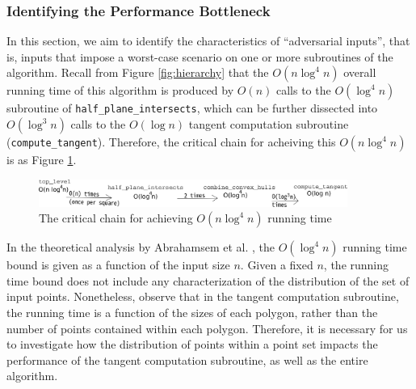 \documentclass{article}
\newcommand{\figref}[1]{Figure \ref{#1}}
\begin{document}
\subsubsection{Identifying the Performance Bottleneck}

In this section, we aim to identify the characteristics of ``adversarial inputs'', that is, inputs that impose a worst-case scenario on one or more subroutines of the algorithm. Recall from \figref{fig:hierarchy} that the $O(n\log^4n)$ overall running time of this algorithm is produced by $O(n)$ calls to the $O(\log^4 n)$ subroutine of \texttt{half\_plane\_intersects}, which can be further dissected into $O(\log^3 n)$ calls to the $O(\log n)$ tangent computation subroutine (\texttt{compute\_tangent}). Therefore, the critical chain for acheiving this $O(n \log^4 n)$ is as \figref{fig:tangent_dependencies}.

\begin{figure}[h!]
    \centering
    \includegraphics[width=0.9\textwidth]{images/tangent_computations_simplified.png}
    \caption{The critical chain for achieving $O(n \log^4 n)$ running time}
    \label{fig:tangent_dependencies}
\end{figure}

In the theoretical analysis by Abrahamsem et al. \cite{abb17}, the $O(\log^4 n)$ running time bound is given as a function of the input size $n$. Given a fixed $n$, the running time bound does not include any characterization of the distribution of the set of input points. Nonetheless, observe that in the tangent computation subroutine, the running time is a function of the sizes of each polygon, rather than the number of points contained within each polygon. Therefore, it is necessary for us to investigate how the distribution of points within a point set impacts the performance of the tangent computation subroutine, as well as the entire algorithm.
\end{document}
